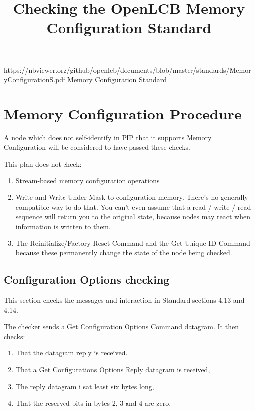 

\title{Checking the OpenLCB Memory Configuration Standard}


\maketitle

\introductionCaveats
    {https://nbviewer.org/github/openlcb/documents/blob/master/standards/MemoryConfigurationS.pdf}
    {Memory Configuration Standard}

\section{Memory Configuration Procedure}


A node which does not self-identify in PIP that it supports
Memory Configuration will be considered to have passed these checks.
\pipsetFootnote

This plan does not check:
\begin{enumerate}
\item Stream-based memory configuration operations
\item Write and Write Under Mask to configuration memory.  
There's no generally-compatible way to do that.
You can't even assume that a read / write / read sequence will return you to the original
state, because nodes may react when information is written to them.
\item The Reinitialize/Factory Reset Command and the Get Unique ID Command
because these permanently change the state of the node being checked.
\end{enumerate}

\subsection{Configuration Options checking}

This section checks the messages and interaction in Standard sections 4.13 and 4.14.

The checker sends a Get Configuration Options Command datagram.  It then checks:
\begin{enumerate}
\item That the datagram reply is received.
\item That a Get Configurations Options Reply datagram is received,
\item The reply datagram i sat least six bytes long,
\item That the reserved bits in bytes 2, 3 and 4 are zero.
\end{enumerate}

